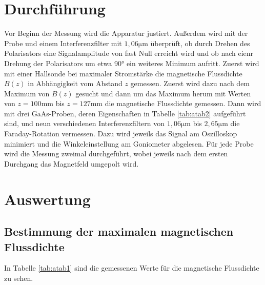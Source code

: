 \section{Durchführung}
Vor Beginn der Messung wird die Apparatur justiert. Außerdem wird mit der Probe und einem Interferenzfilter mit 
$1,06 \si{\micro \meter}$ überprüft, ob durch Drehen des Polarisators eine Signalamplitude von fast Null erreicht wird 
und ob nach eienr Drehung der Polarisators um etwa 90° ein weiteres Minimum aufritt.
Zuerst wird mit einer Hallsonde bei maximaler Stromstärke die magnetische Flussdichte $B(z)$ in Abhängigkeit vom 
Abstand $z$ gemessen. Zuerst wird dazu nach dem Maximum von $B(z)$ gesucht und dann um das Maximum herum mit Werten 
von $z = 100 \si{\milli\meter}$ bis $z = 127 \si{\milli\meter}$ die magnetische Flussdichte gemessen.
Dann wird mit drei GaAs-Proben, deren Eigenschaften in Tabelle \ref{tab:atab2} aufgeführt sind, und neun verschiedenen 
Interferenzfiltern von $1,06 \si{\micro \meter}$ bis $2,65 \si{\micro \meter}$ die Faraday-Rotation vermessen.
Dazu wird jeweils das Signal am Oszilloskop minimiert und die Winkeleinstellung am Goniometer abgelesen. Für jede Probe 
wird die Messung zweimal durchgeführt, wobei jeweils nach dem ersten Durchgang das Magnetfeld umgepolt wird.

\section{Auswertung}
\subsection{Bestimmung der maximalen magnetischen Flussdichte}
In Tabelle \ref{tab:atab1} sind die gemessenen Werte für die magnetische Flussdichte zu sehen. 

